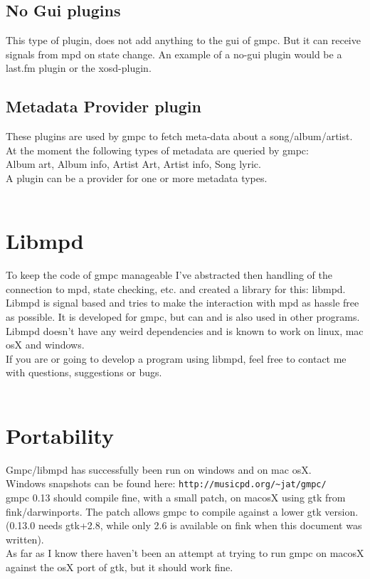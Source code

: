 \documentclass{article}
\begin{document}
\subsection {No Gui plugins}
This type of plugin, does not add anything to the gui of gmpc. But it can receive signals from mpd on state change. An example of a no-gui plugin would be a last.fm plugin or the xosd-plugin.\\
\subsection {Metadata Provider plugin}
These plugins are used by gmpc to fetch meta-data about a song/album/artist. At the moment the following types of metadata are queried by gmpc:\\
Album art, Album info, Artist Art, Artist info, Song lyric.\\ A plugin can be a provider for one or more metadata types.\\
\\
\section {Libmpd}
To keep the code of gmpc manageable I've abstracted then handling of the connection to mpd, state checking, etc. and created a library for this: libmpd. Libmpd is signal based and tries to make the interaction with mpd as hassle free as possible. It is developed for gmpc, but can and is also used in other programs. Libmpd doesn't have any weird dependencies and is known to work on linux, mac osX and windows.\\
If you are or going to develop a program using libmpd, feel free to contact me with questions, suggestions or bugs.\\
\\

\section {Portability}
Gmpc/libmpd has successfully been run on windows and on mac osX. \\
Windows snapshots can be found here: \verb+http://musicpd.org/~jat/gmpc/+\\
gmpc 0.13 should compile fine, with a small patch, on macosX using gtk from fink/darwinports. The patch allows gmpc to compile against a lower gtk version. (0.13.0 needs gtk+2.8, while only 2.6 is available on fink when this document was written).\\
As far as I know there haven't been an attempt at trying to run gmpc on macosX against the osX port of gtk, but it should work fine.\\
\end{document}
